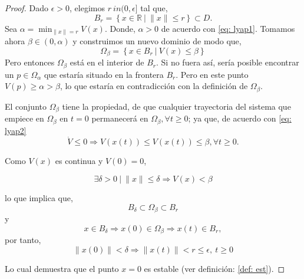 \begin{proof}
Dado $\epsilon > 0$, elegimos $r \ in (0,\epsilon]$ tal que,
\begin{equation*}
B_r = \left\{ x \in \mathbb{R} \ |\  \|x\| \leq r \right\} \subset D.
\end{equation*}
Sea $\alpha =  \min_{\|x\| = r}V(x)$. Donde, $\alpha >0$ de acuerdo con \ref{eq: lyap1}. Tomamos ahora $\beta \in (0,\alpha)$ y construimos un nuevo dominio de modo que,
\begin{equation*}
\Omega_\beta = \left\{ x \in B_r \ |\  V(x) \leq \beta \right\}
\end{equation*}
Pero entonces $\Omega_\beta$ está en el interior de $B_r$.  Si no fuera así, sería posible encontrar un $p \in \Omega_\alpha$ que estaría situado en la frontera $B_r$. Pero en este punto $V(p) \ge \alpha > \beta$, lo que estaría en contradicción con la definición de $\Omega_\beta$. 

El conjunto $\Omega_\beta$ tiene la propiedad, de que cualquier trayectoria del sistema que empiece en $\Omega_\beta$  en $t=0$ permanecerá en $\Omega_\beta, \forall t \geq 0$; ya que, de acuerdo con \ref{eq: lyap2}
\begin{equation*}
\dot V \leq 0 \Rightarrow V(x(t)) \leq V(x(t)) \leq \beta, \forall t \geq 0.
\end{equation*}

Como $V(x)$ es continua y $V(0) = 0$,

\begin{equation*}
\exists \delta > 0\  |\  \|x\| \leq \delta \Rightarrow V(x) < \beta
\end {equation*}

lo que implica que,
\begin{equation*}
B_\delta \subset \Omega_\beta \subset B_r
\end{equation*}
y
\begin{equation*}
x \in B_\delta \Rightarrow x(0) \in \Omega_\beta \Rightarrow x(t) \in B_r,
\end{equation*}
por tanto,
\begin{equation*}
\|x(0)\| < \delta \Rightarrow \|x(t)\|<r \leq \epsilon, \ t \geq 0
\end{equation*}

Lo cual demuestra que el punto $x=0$ es estable (ver definición: \ref{def: est}). 


\end{proof}
